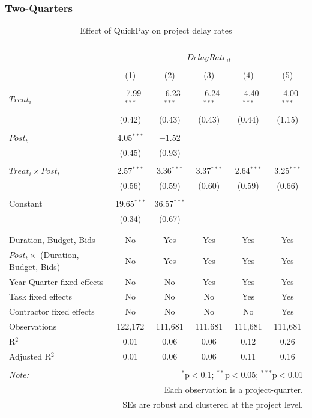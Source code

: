 \documentclass[
]{article}
\begin{document}
\hypertarget{two-quarters}{%
\subsubsection{Two-Quarters}\label{two-quarters}}

\begin{table}[H] \centering 
  \caption{Effect of QuickPay on project delay rates} 
  \label{} 
\small 
\begin{tabular}{@{\extracolsep{-2pt}}lccccc} 
\\[-1.8ex]\hline 
\hline \\[-1.8ex] 
\\[-1.8ex] & \multicolumn{5}{c}{$DelayRate_{it}$} \\ 
\\[-1.8ex] & (1) & (2) & (3) & (4) & (5)\\ 
\hline \\[-1.8ex] 
 $Treat_i$ & $-$7.99$^{***}$ & $-$6.23$^{***}$ & $-$6.24$^{***}$ & $-$4.40$^{***}$ & $-$4.00$^{***}$ \\ 
  & (0.42) & (0.43) & (0.43) & (0.44) & (1.15) \\ 
  & & & & & \\ 
 $Post_t$ & 4.05$^{***}$ & $-$1.52 &  &  &  \\ 
  & (0.45) & (0.93) &  &  &  \\ 
  & & & & & \\ 
 $Treat_i \times Post_t$ & 2.57$^{***}$ & 3.36$^{***}$ & 3.37$^{***}$ & 2.64$^{***}$ & 3.25$^{***}$ \\ 
  & (0.56) & (0.59) & (0.60) & (0.59) & (0.66) \\ 
  & & & & & \\ 
 Constant & 19.65$^{***}$ & 36.57$^{***}$ &  &  &  \\ 
  & (0.34) & (0.67) &  &  &  \\ 
  & & & & & \\ 
\hline \\[-1.8ex] 
Duration, Budget, Bids & No & Yes & Yes & Yes & Yes \\ 
$Post_t \times$  (Duration, Budget, Bids) & No & Yes & Yes & Yes & Yes \\ 
Year-Quarter fixed effects & No & No & Yes & Yes & Yes \\ 
Task fixed effects & No & No & No & Yes & Yes \\ 
Contractor fixed effects & No & No & No & No & Yes \\ 
Observations & 122,172 & 111,681 & 111,681 & 111,681 & 111,681 \\ 
R$^{2}$ & 0.01 & 0.06 & 0.06 & 0.12 & 0.26 \\ 
Adjusted R$^{2}$ & 0.01 & 0.06 & 0.06 & 0.11 & 0.16 \\ 
\hline 
\hline \\[-1.8ex] 
\textit{Note:}  & \multicolumn{5}{r}{$^{*}$p$<$0.1; $^{**}$p$<$0.05; $^{***}$p$<$0.01} \\ 
 & \multicolumn{5}{r}{Each observation is a project-quarter.} \\ 
 & \multicolumn{5}{r}{SEs are robust and clustered at the project level.} \\ 
\end{tabular} 
\end{table}
\end{document}
